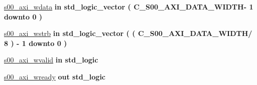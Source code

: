\begin{DoxyCompactItemize}
\hyperlink{classGPIO__v1__0_ae2b15b55ee463fd9dd030ee29db6bb17}{s00\+\_\+axi\+\_\+wdata}  {\bfseries {\bfseries \textcolor{vhdlchar}{in}\textcolor{vhdlchar}{ }}} {\bfseries \textcolor{vhdlchar}{std\+\_\+logic\+\_\+vector}\textcolor{vhdlchar}{ }\textcolor{vhdlchar}{(}\textcolor{vhdlchar}{ }\textcolor{vhdlchar}{ }\textcolor{vhdlchar}{ }\textcolor{vhdlchar}{ }\textcolor{vhdlchar}{C\+\_\+\+S00\+\_\+\+A\+X\+I\+\_\+\+D\+A\+T\+A\+\_\+\+W\+I\+D\+TH}\textcolor{vhdlchar}{-\/}\textcolor{vhdlchar}{ } \textcolor{vhdldigit}{1} \textcolor{vhdlchar}{ }\textcolor{vhdlchar}{downto}\textcolor{vhdlchar}{ }\textcolor{vhdlchar}{ } \textcolor{vhdldigit}{0} \textcolor{vhdlchar}{ }\textcolor{vhdlchar}{)}\textcolor{vhdlchar}{ }} 
\item 
\mbox{\label{classGPIO__v1__0_a120924bc3fd5fd10ec0f96e19c3f4904}} 
\hyperlink{classGPIO__v1__0_a120924bc3fd5fd10ec0f96e19c3f4904}{s00\+\_\+axi\+\_\+wstrb}  {\bfseries {\bfseries \textcolor{vhdlchar}{in}\textcolor{vhdlchar}{ }}} {\bfseries \textcolor{vhdlchar}{std\+\_\+logic\+\_\+vector}\textcolor{vhdlchar}{ }\textcolor{vhdlchar}{(}\textcolor{vhdlchar}{ }\textcolor{vhdlchar}{(}\textcolor{vhdlchar}{ }\textcolor{vhdlchar}{ }\textcolor{vhdlchar}{ }\textcolor{vhdlchar}{ }\textcolor{vhdlchar}{C\+\_\+\+S00\+\_\+\+A\+X\+I\+\_\+\+D\+A\+T\+A\+\_\+\+W\+I\+D\+TH}\textcolor{vhdlchar}{/}\textcolor{vhdlchar}{ } \textcolor{vhdldigit}{8} \textcolor{vhdlchar}{ }\textcolor{vhdlchar}{)}\textcolor{vhdlchar}{ }\textcolor{vhdlchar}{-\/}\textcolor{vhdlchar}{ } \textcolor{vhdldigit}{1} \textcolor{vhdlchar}{ }\textcolor{vhdlchar}{downto}\textcolor{vhdlchar}{ }\textcolor{vhdlchar}{ } \textcolor{vhdldigit}{0} \textcolor{vhdlchar}{ }\textcolor{vhdlchar}{)}\textcolor{vhdlchar}{ }} 
\item 
\mbox{\label{classGPIO__v1__0_a24e90907193647007d2947353740114d}} 
\hyperlink{classGPIO__v1__0_a24e90907193647007d2947353740114d}{s00\+\_\+axi\+\_\+wvalid}  {\bfseries {\bfseries \textcolor{vhdlchar}{in}\textcolor{vhdlchar}{ }}} {\bfseries \textcolor{vhdlchar}{std\+\_\+logic}\textcolor{vhdlchar}{ }} 
\item 
\mbox{\label{classGPIO__v1__0_a3fc60abc0cfbfa90003a83bffdd476c4}} 
\hyperlink{classGPIO__v1__0_a3fc60abc0cfbfa90003a83bffdd476c4}{s00\+\_\+axi\+\_\+wready}  {\bfseries {\bfseries \textcolor{vhdlchar}{out}\textcolor{vhdlchar}{ }}} {\bfseries \textcolor{vhdlchar}{std\+\_\+logic}\textcolor{vhdlchar}{ }} 

\end{DoxyCompactItemize}
